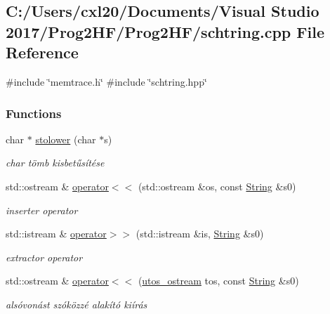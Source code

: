 \subsection{C\+:/\+Users/cxl20/\+Documents/\+Visual Studio 2017/\+Prog2\+H\+F/\+Prog2\+H\+F/schtring.cpp File Reference}
\label{schtring_8cpp}
{\ttfamily \#include \char`\"{}memtrace.\+h\char`\"{}}\newline
{\ttfamily \#include \char`\"{}schtring.\+hpp\char`\"{}}\newline
\subsubsection*{Functions}
\begin{DoxyCompactItemize}
\item 
char $\ast$ \mbox{\hyperlink{schtring_8cpp_a9d7d0d0ea2b8f0f7c6d53fe66fc0b301}{stolower}} (char $\ast$s)
\begin{DoxyCompactList}\small\item\em char tömb kisbetűsítése \end{DoxyCompactList}\item 
std\+::ostream \& \mbox{\hyperlink{schtring_8cpp_aef14876e55f43fb4ffa7b91664467ecb}{operator$<$$<$}} (std\+::ostream \&os, const \mbox{\hyperlink{class_string}{String}} \&s0)
\begin{DoxyCompactList}\small\item\em inserter operator \end{DoxyCompactList}\item 
std\+::istream \& \mbox{\hyperlink{schtring_8cpp_aea8ed420ad5e70828bc42b0fb9b49366}{operator$>$$>$}} (std\+::istream \&is, \mbox{\hyperlink{class_string}{String}} \&s0)
\begin{DoxyCompactList}\small\item\em extractor operator \end{DoxyCompactList}\item 
std\+::ostream \& \mbox{\hyperlink{schtring_8cpp_a06c0f45780d45c035c1eabecbb34198d}{operator$<$$<$}} (\mbox{\hyperlink{structutos__ostream}{utos\+\_\+ostream}} tos, const \mbox{\hyperlink{class_string}{String}} \&s0)
\begin{DoxyCompactList}\small\item\em alsóvonást szóközzé alakító kiírás \end{DoxyCompactList}\end{DoxyCompactItemize}


